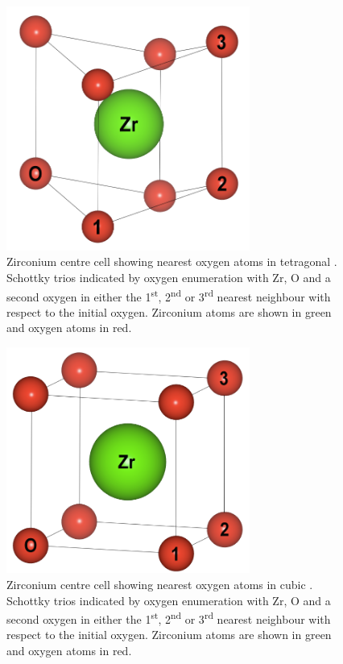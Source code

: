 \begin{figure}[ht] %
\centering
\includegraphics[width=8cm]{images/zr_centre_tet.png}
\caption{Zirconium centre  cell showing nearest oxygen atoms in tetragonal \zirconia. Schottky trios indicated by oxygen enumeration with Zr, O and a second oxygen in either the 1\textsuperscript{st}, 2\textsuperscript{nd} or 3\textsuperscript{rd} nearest neighbour with respect to the initial oxygen. Zirconium atoms are shown in green and oxygen atoms in red.}
\label{figure:tetschottky}
\end{figure}

\begin{figure}[ht] %
\centering
\includegraphics[width=8cm]{images/sd_cubic_zro2.png}
\caption{Zirconium centre cell showing nearest oxygen atoms in cubic \zirconia. Schottky trios indicated by oxygen enumeration with Zr, O and a second oxygen in either the 1\textsuperscript{st}, 2\textsuperscript{nd} or 3\textsuperscript{rd} nearest neighbour with respect to the initial oxygen. Zirconium atoms are shown in green and oxygen atoms in red.}
\label{figure:cubicschottky}
\end{figure}

